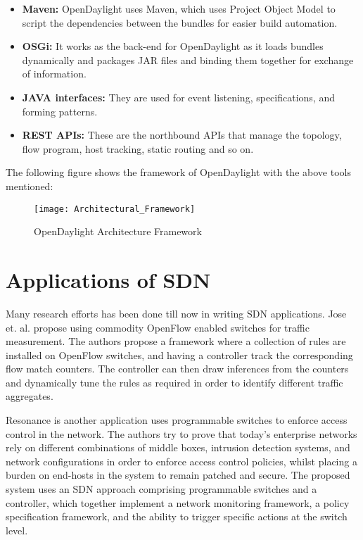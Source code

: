 \begin{itemize}
	\item \textbf{Maven:} OpenDaylight uses Maven, which uses Project Object Model to script the dependencies between the bundles for easier build automation.
	\item \textbf{OSGi:} It works as the back-end for OpenDaylight as it loads bundles dynamically and packages JAR files and binding them together for exchange of information.
	\item \textbf{JAVA interfaces:} They are used for event listening, specifications, and forming patterns. 
	\item \textbf{REST APIs:} These are the northbound APIs that manage the topology, flow program, host tracking, static routing and so on.
	
\end{itemize}

The following figure shows the framework of OpenDaylight with the above tools mentioned:

\begin{figure}[H]
	\centering
	\texttt{[image: Architectural\_Framework]}
	\caption{OpenDaylight Architecture Framework \cite{OpenDaylight_framework}} \label{fig:OpenDaylight_framework}
	\vspace{-10pt}
\end{figure}

\section{Applications of SDN} \label{SDN_applications}

Many research efforts has been done till now in writing SDN applications. Jose et. al. \cite{jose2011online} propose using commodity OpenFlow enabled switches for traffic measurement. The authors propose a framework where a collection of rules are installed on OpenFlow switches, and having a controller track the corresponding flow match counters. The controller can then draw inferences from the counters and dynamically tune the rules as required in order to identify different traffic aggregates.

Resonance \cite{Nayak:2009:RDA:1592681.1592684} is another application uses programmable switches to enforce access control in the network. The authors try to prove that today’s enterprise networks rely on different combinations of middle boxes, intrusion detection systems, and network configurations in order to enforce access control policies, whilst placing a burden on end-hosts in the system to remain patched and secure. The proposed system uses an SDN approach comprising programmable switches and a controller, which together implement a network monitoring framework, a policy specification framework, and the ability to trigger specific actions at the switch level.

